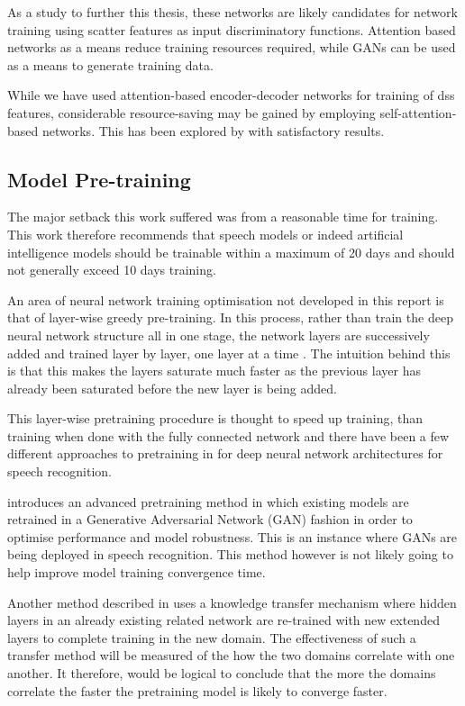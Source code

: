 As a study to further this thesis, these networks are likely candidates for network training using scatter features as input discriminatory functions.  Attention based networks as a means reduce training resources required, while GANs can be used as a means to generate training data.

While we have used attention-based encoder-decoder networks for training of \acrshort{dss} features, considerable resource-saving may be gained by employing self-attention-based networks.  This has been explored by  \cite{salazar2019self} with satisfactory results.

\subsection{Model Pre-training}
The major setback this work suffered was from a reasonable time for training.  This work therefore recommends that speech models or indeed artificial intelligence models should be trainable within a maximum of 20 days and should not generally exceed 10 days training.

An area of neural network training optimisation not developed in this report is that of layer-wise greedy pre-training.  In this process, rather than train the deep neural network structure all in one stage, the network layers are successively added and trained layer by layer, one layer at a time \citep{Goodfellow-et-al-2016}.  The intuition behind this is that this makes the layers saturate much faster as the previous layer has already been saturated before the new layer is being added.

This layer-wise pretraining procedure is thought to speed up training, than training when done with the fully connected network and there have been a few different approaches to pretraining in for deep neural network architectures for speech recognition. 

\cite{hendrycks2019using} introduces an advanced pretraining method in which existing models are retrained in a Generative Adversarial Network (GAN) fashion in order to optimise performance and model robustness.  This is an instance where GANs are being deployed in speech recognition.  This method however is not likely going to help improve model training convergence time.

Another method described in \citep{ramachandran2016unsupervised} uses a knowledge transfer mechanism where hidden layers in an already existing related network are re-trained with new extended layers to complete training in the new domain.  The effectiveness of such a transfer method will be measured of the how the two domains correlate with one another. It therefore, would be logical to conclude that the more the domains correlate the faster the pretraining model is likely to converge faster.

